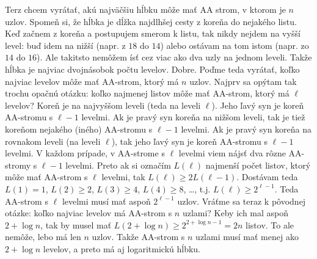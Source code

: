 \documentclass[10pt]{article}
\def\ods{\vspace*{10pt}}
\begin{document}
{{
}


\ods
Terz chcem vyrátať, akú najväčšiu hĺbku môže mať AA strom, v ktorom je $n$ uzlov. Spomeň si,
že hĺbka je dĺžka najdlhšej cesty z koreňa do nejakého listu. Keď začnem z koreňa a postupujem
smerom k listu, tak nikdy nejdem na vyšší level: buď idem na nižší (napr. z $18$ do
$14$) alebo ostávam na tom istom (napr. zo $14$ do $16$). Ale takitsto nemôžem ísť
cez viac ako dva uzly na jednom leveli. Takže hĺbka je najviac dvojnásobok počtu levelov.
Dobre. Poďme teda vyrátať, koľko najviac levelov môže mať AA-strom, ktorý má $n$ uzlov. 
Najprv sa opýtam tak trochu opačnú otázku: 
koľko najmenej listov môže mať AA-strom, ktorý má $\ell$ levelov?
Koreň je na najvyššom leveli (teda na leveli $\ell$). 
Jeho ľavý syn je koreň AA-stromu s $\ell-1$ levelmi. Ak je
pravý syn koreňa na nižšom leveli, tak je tiež
koreňom nejakého (iného) AA-stromu s $\ell-1$ levelmi.
Ak je pravý syn koreňa na rovnakom leveli (na leveli $\ell$), tak jeho ľavý syn je koreň 
AA-stromu s $\ell-1$ levelmi. V každom prípade, v AA-strome s $\ell$ levelmi
viem nájsť dva rôzne AA-stromy
s $\ell-1$ levelmi. Preto ak si označím $L(\ell)$ najmenší počet listov, ktorý môže
mať AA-strom s $\ell$ levelmi, tak $L(\ell)\ge2L(\ell-1)$.
Dostávam teda $L(1)=1$, $L(2)\ge2$, $L(3)\ge4$, $L(4)\ge8$, \ldots, t.j. 
$L(\ell)\ge2^{\ell-1}$. Teda AA-strom s $\ell$ levelmi musí mať aspoň $2^{\ell-1}$
uzlov. Vráťme sa teraz k pôvodnej otázke: koľko najviac levelov má AA-strom s $n$ uzlami?
Keby ich mal aspoň $2+\log n$, tak by musel mať 
$L(2+\log n)\ge2^{2+\log n-1}=2n$ listov. To ale nemôže, lebo má len $n$ uzlov. Takže
AA-strom s $n$ uzlami musí mať menej ako $2+\log n$ levelov, a preto má aj logaritmickú hĺbku.

}
\end{document}
